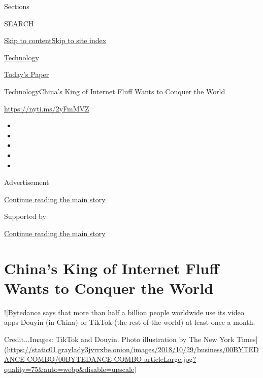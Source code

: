 Sections

SEARCH

\protect\hyperlink{site-content}{Skip to
content}\protect\hyperlink{site-index}{Skip to site index}

\href{https://www.nytimes3xbfgragh.onion/section/technology}{Technology}

\href{https://myaccount.nytimes3xbfgragh.onion/auth/login?response_type=cookie\&client_id=vi}{}

\href{https://www.nytimes3xbfgragh.onion/section/todayspaper}{Today's
Paper}

\href{/section/technology}{Technology}\textbar{}China's King of Internet
Fluff Wants to Conquer the World

\href{https://nyti.ms/2yFmMVZ}{https://nyti.ms/2yFmMVZ}

\begin{itemize}
\item
\item
\item
\item
\item
\end{itemize}

Advertisement

\protect\hyperlink{after-top}{Continue reading the main story}

Supported by

\protect\hyperlink{after-sponsor}{Continue reading the main story}

\hypertarget{chinas-king-of-internet-fluff-wants-to-conquer-the-world}{%
\section{China's King of Internet Fluff Wants to Conquer the
World}\label{chinas-king-of-internet-fluff-wants-to-conquer-the-world}}

!{[}Bytedance says that more than half a billion people worldwide use
its video apps Douyin (in China) or TikTok (the rest of the world) at
least once a month.

Credit...Images: TikTok and Douyin. Photo illustration by The New York
Times{]}(\href{https://static01.graylady3jvrrxbe.onion/images/2018/10/29/business/00BYTEDANCE-COMBO/00BYTEDANCE-COMBO-articleLarge.jpg?quality=75\&auto=webp\&disable=upscale}{https://static01.graylady3jvrrxbe.onion/images/2018/10/29/business/00BYTEDANCE-COMBO/00BYTEDANCE-COMBO-articleLarge.jpg?quality=75\&auto=webp\&disable=upscale})

